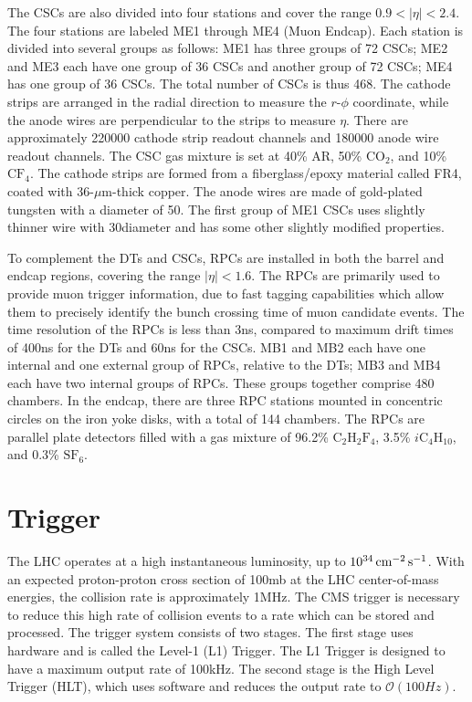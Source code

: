 \documentclass[12pt]{thesis}  %
\begin{document}
The CSCs are also divided into four stations and cover the range $0.9<|\eta|<2.4$. The four stations are labeled ME1 through ME4 (Muon Endcap). Each station is divided into several groups as follows: ME1 has three groups of 72 CSCs; ME2 and ME3 each have one group of 36 CSCs and another group of 72 CSCs; ME4 has one group of 36 CSCs. The total number of CSCs is thus 468. The cathode strips are arranged in the radial direction to measure the $r$-$\phi$ coordinate, while the anode wires are perpendicular to the strips to measure $\eta$. There are approximately 220000 cathode strip readout channels and 180000 anode wire readout channels. The CSC gas mixture is set at 40\% AR, 50\% $\text{CO}_2$, and 10\% $\text{CF}_4$. The cathode strips are formed from a fiberglass/epoxy material called FR4, coated with 36-$\mu$m-thick copper. The anode wires are made of gold-plated tungsten with a diameter of 50\mum. The first group of ME1 CSCs uses slightly thinner wire with 30\mum diameter and has some other slightly modified properties.

To complement the DTs and CSCs, RPCs are installed in both the barrel and endcap regions, covering the range $|\eta|<1.6$. The RPCs are primarily used to provide muon trigger information, due to fast tagging capabilities which allow them to precisely identify the bunch crossing time of muon candidate events. The time resolution of the RPCs is less than 3\unit{ns}, compared to maximum drift times of 400\unit{ns} for the DTs and 60\unit{ns} for the CSCs. MB1 and MB2 each have one internal and one external group of RPCs, relative to the DTs; MB3 and MB4 each have two internal groups of RPCs. These groups together comprise 480 chambers. In the endcap, there are three RPC stations mounted in concentric circles on the iron yoke disks, with a total of 144 chambers. The RPCs are parallel plate detectors filled with a gas mixture of 96.2\% $\text{C}_2\text{H}_2\text{F}_4$, 3.5\% $i\text{C}_4\text{H}_{10}$, and 0.3\% $\text{SF}_6$.


\section{Trigger}

The LHC operates at a high instantaneous luminosity, up to $10^{34}\,\text{cm}^\text{$-$2}\,\text{s}^\text{$-$1}$. With an expected proton-proton cross section of 100\unit{mb} at the LHC center-of-mass energies, the collision rate is approximately 1\unit{MHz}. The CMS trigger is necessary to reduce this high rate of collision events to a rate which can be stored and processed. The trigger system consists of two stages. The first stage uses hardware and is called the Level-1 (L1) Trigger. The L1 Trigger is designed to have a maximum output rate of 100\unit{kHz}. The second stage is the High Level Trigger (HLT), which uses software and reduces the output rate to $\mathcal{O}(100\unit{Hz})$.
\end{document}
